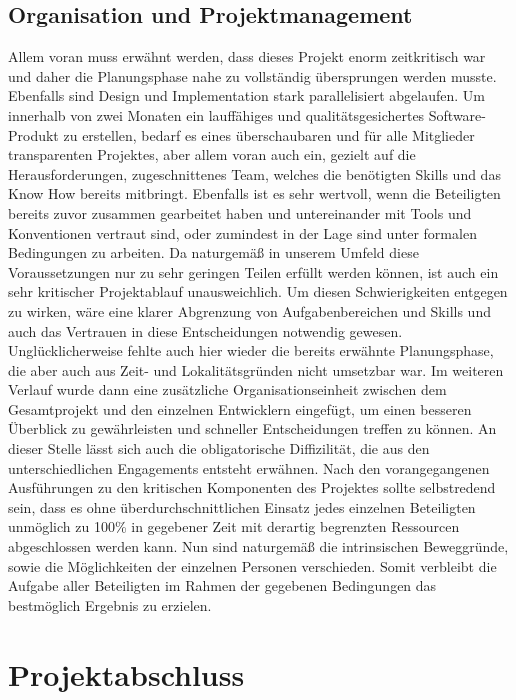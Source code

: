 \documentclass[12pt,a4paper]{article}
\begin{document}
\subsection{Organisation und Projektmanagement}
Allem voran muss erwähnt werden, dass dieses Projekt enorm zeitkritisch war und daher die Planungsphase nahe zu vollständig übersprungen werden musste. Ebenfalls sind Design und Implementation stark parallelisiert abgelaufen. Um innerhalb von zwei Monaten ein lauffähiges und qualitätsgesichertes Software-Produkt zu erstellen, bedarf es eines überschaubaren und für alle Mitglieder transparenten Projektes, aber allem voran auch ein, gezielt auf die Herausforderungen, zugeschnittenes Team, welches die benötigten Skills und das Know How bereits mitbringt. Ebenfalls ist es sehr wertvoll, wenn die Beteiligten bereits zuvor zusammen gearbeitet haben und untereinander mit Tools und Konventionen vertraut sind, oder zumindest in der Lage sind unter formalen Bedingungen zu arbeiten. Da naturgemäß in unserem Umfeld diese Voraussetzungen nur zu sehr geringen Teilen erfüllt werden können, ist auch ein sehr kritischer Projektablauf unausweichlich. Um diesen Schwierigkeiten entgegen zu wirken, wäre eine klarer Abgrenzung von Aufgabenbereichen
und Skills und auch das Vertrauen in diese Entscheidungen notwendig gewesen. Unglücklicherweise fehlte auch hier wieder die bereits erwähnte Planungsphase, die aber auch aus Zeit- und Lokalitätsgründen nicht umsetzbar war. Im weiteren Verlauf wurde dann eine zusätzliche Organisationseinheit zwischen dem Gesamtprojekt und den einzelnen Entwicklern eingefügt, um einen besseren Überblick zu gewährleisten und schneller Entscheidungen treffen zu können. An dieser Stelle lässt sich auch die obligatorische Diffizilität, die aus den unterschiedlichen Engagements entsteht erwähnen. Nach den vorangegangenen Ausführungen zu den kritischen Komponenten des Projektes sollte selbstredend sein, dass es ohne überdurchschnittlichen Einsatz jedes einzelnen Beteiligten
unmöglich zu 100\% in gegebener Zeit mit derartig begrenzten Ressourcen abgeschlossen werden kann. Nun sind naturgemäß die intrinsischen Beweggründe, sowie die Möglichkeiten der einzelnen Personen verschieden. Somit verbleibt die Aufgabe aller Beteiligten im Rahmen der gegebenen
Bedingungen das bestmöglich Ergebnis zu erzielen.
\newpage
\section{Projektabschluss}
\end{document}
